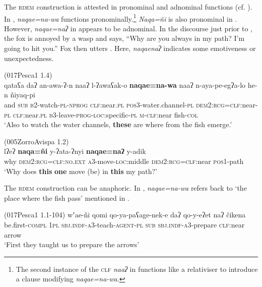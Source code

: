 \documentclass[output=paper,colorlinks,citecolor=brown]{langscibook}
\begin{document}
The \textsc{rdem} construction is attested in pronominal and adnominal functions (cf. ). In , \textit{naqae=na-wa} functions pronominally.\footnote{The second instance of the \textsc{clf} \textit{naaʔ} in  functions like a relativiser to introduce a clause modifying \textit{naqae=na-wa}.} \textit{Naqa=ñi} is also pronominal in . However, \textit{naqae=naʔ} in  appears to be adnominal. In the discourse just prior to , the fox is annoyed by a wasp and says, “Why are you always in my path? I’m going to hit you.” Fox then utters . Here, \textit{naqaenaʔ} indicates some emotiveness or unexpectedness.

\ea\label{ex:payne:71} (017Pesca1 1.4)\\
\gll  qataʕa  daʔ  an-awa-ʔ-n  naaʔ  l-ʔawaʕak-o \textbf{naqae=na-wa}  naaʔ  n-aya-pe-egʔa-lo he-n  ñiyaq-pi \\
and \textsc{sub}  \textsc{b2}-watch-\textsc{pl-nprog}  \textsc{clf}:near.\textsc{pl}  \textsc{pos3}-water.channel-\textsc{pl} \textsc{dem2:rcg=clf}:near-\textsc{pl}  \textsc{clf}:near.\textsc{pl}  \textsc{b3}-leave-\textsc{prog-loc}:specific-\textsc{pl}  \textsc{m-clf}:near  fish-\textsc{col}\\
\glt ‘Also to watch the water channels, \textbf{these} are where from the fish emerge.’ 
\z

\ea\label{ex:payne:72} (005ZorroAvispa 1.2)\\
\gll  lʔeʔ  \textbf{naqa=ñi}  y-ʔata-ʔnyi  \textbf{naqae=naʔ}  y-adik\\
why  \textsc{dem2:rcg=clf:no.ext}  \textsc{a3}-move-\textsc{loc}:middle  \textsc{dem2:rcg=clf}:near  \textsc{pos1}-path\\
\glt ‘Why does \textbf{this} \textbf{one} move (be) in \textbf{this} my path?’ 
\z

The \textsc{rdem} construction can be anaphoric. In , \textit{naqae=na-wa} refers back to ‘the place where the fish pass’ mentioned in .

\ea\label{ex:payne:73} (017Pesca1 1.1-104)
\ea\label{ex:payne:73a}
\gll wʼae-ñi  qomi  qo-ya-paʕage-nek-e daʔ  qo-y-eʔet  naʔ  čikena\\
 be.first-\textsc{compl}  \textsc{1pl}    \textsc{sbj.indf-a3}-teach-\textsc{agent-pl}  \textsc{sub}  \textsc{sbj.indf-a3}-prepare \textsc{clf}:near  arrow\\
\glt ‘First they taught us to prepare the arrows’
\end{document}
